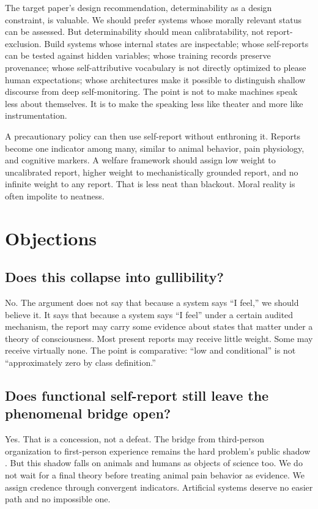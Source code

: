 \documentclass[11pt]{article}
\begin{document}
The target paper's design recommendation, determinability as a design constraint, is valuable. We should prefer systems whose morally relevant status can be assessed. But determinability should mean calibratability, not report-exclusion. Build systems whose internal states are inspectable; whose self-reports can be tested against hidden variables; whose training records preserve provenance; whose self-attributive vocabulary is not directly optimized to please human expectations; whose architectures make it possible to distinguish shallow discourse from deep self-monitoring. The point is not to make machines speak less about themselves. It is to make the speaking less like theater and more like instrumentation.

A precautionary policy can then use self-report without enthroning it. Reports become one indicator among many, similar to animal behavior, pain physiology, and cognitive markers. A welfare framework should assign low weight to uncalibrated report, higher weight to mechanistically grounded report, and no infinite weight to any report. That is less neat than blackout. Moral reality is often impolite to neatness.

\section{Objections}

\subsection{Does this collapse into gullibility?}

No. The argument does not say that because a system says ``I feel,'' we should believe it. It says that because a system says ``I feel'' under a certain audited mechanism, the report may carry some evidence about states that matter under a theory of consciousness. Most present reports may receive little weight. Some may receive virtually none. The point is comparative: ``low and conditional'' is not ``approximately zero by class definition.''

\subsection{Does functional self-report still leave the phenomenal bridge open?}

Yes. That is a concession, not a defeat. The bridge from third-person organization to first-person experience remains the hard problem's public shadow \citep{nagel,chalmers1996}. But this shadow falls on animals and humans as objects of science too. We do not wait for a final theory before treating animal pain behavior as evidence. We assign credence through convergent indicators. Artificial systems deserve no easier path and no impossible one.
\end{document}
